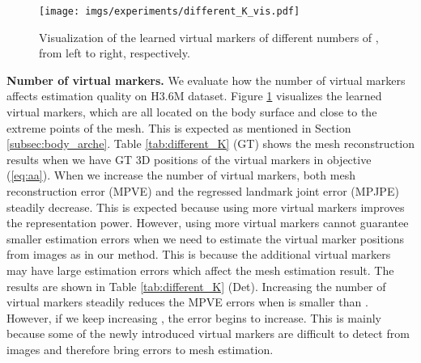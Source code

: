 \begin{figure}[t]
	\centering
	\texttt{[image: imgs/experiments/different\_K\_vis.pdf]}
	\caption{Visualization of the learned virtual markers of different numbers of , from left to right, respectively.
    }
	\label{fig:different_K_vis}
\end{figure}






\vspace{0.5em}
\noindent\textbf{Number of virtual markers.} 
\label{subsubsec:ablation_K}
We evaluate how the number of virtual markers affects estimation quality on H3.6M \cite{h36m_pami} dataset. Figure \ref{fig:different_K_vis} visualizes the learned virtual markers, which are all located on the body surface and close to the extreme points of the mesh. This is expected as mentioned in Section \ref{subsec:body_arche}.  Table \ref{tab:different_K} (GT) shows the mesh reconstruction results when we have GT 3D positions of the virtual markers in objective (\ref{eq:aa}). When we increase the number of virtual markers, both mesh reconstruction error (MPVE) and the regressed landmark joint error (MPJPE) steadily decrease. This is expected because using more virtual markers improves the representation power. However, using more virtual markers cannot guarantee smaller estimation errors when we need to estimate the virtual marker positions from images as in our method. This is because the additional virtual markers may have large estimation errors which affect the mesh estimation result. The results are shown in Table \ref{tab:different_K} (Det). Increasing the number of virtual markers  steadily reduces the MPVE errors when  is smaller than . However, if we keep increasing , the error begins to increase. This is mainly because some of the newly introduced virtual markers are difficult to detect from images and therefore bring errors to mesh estimation. 



